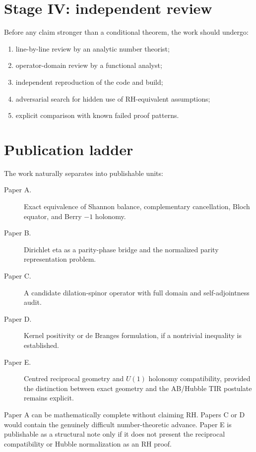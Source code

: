 \section{Stage IV: independent review}
Before any claim stronger than a conditional theorem, the work should undergo:
\begin{enumerate}
\item line-by-line review by an analytic number theorist;
\item operator-domain review by a functional analyst;
\item independent reproduction of the code and build;
\item adversarial search for hidden use of RH-equivalent assumptions;
\item explicit comparison with known failed proof patterns.
\end{enumerate}

\section{Publication ladder}
The work naturally separates into publishable units:
\begin{description}
\item[Paper A.] Exact equivalence of Shannon balance, complementary cancellation, Bloch equator, and Berry $-1$ holonomy.
\item[Paper B.] Dirichlet eta as a parity-phase bridge and the normalized parity representation problem.
\item[Paper C.] A candidate dilation-spinor operator with full domain and self-adjointness audit.
\item[Paper D.] Kernel positivity or de Branges formulation, if a nontrivial inequality is established.
\item[Paper E.] Centred reciprocal geometry and $U(1)$ holonomy compatibility, provided the distinction between exact geometry and the AB/Hubble TIR postulate remains explicit.
\end{description}
Paper A can be mathematically complete without claiming RH. Papers C or D would contain the genuinely difficult number-theoretic advance. Paper E is publishable as a structural note only if it does not present the reciprocal compatibility or Hubble normalization as an RH proof.


